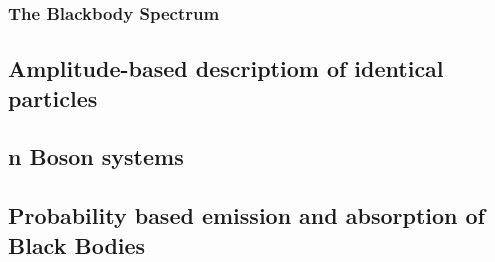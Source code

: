\documentclass[aspectratio=169]{beamer}
\begin{document}
\begin{frame}
\frametitle{The Blackbody Spectrum}
\end{frame}

\subsection{Amplitude-based descriptiom of identical particles}

\subsection{n Boson systems}

\subsection{Probability based emission and absorption of Black Bodies}
\end{document}
